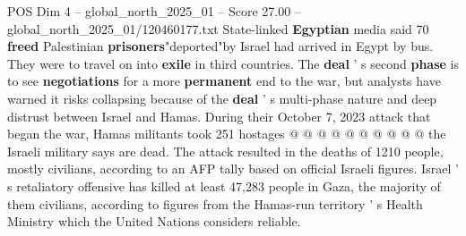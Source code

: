 \begin{textsample}{POS Dim 4 – global\_north\_2025\_01 – Score 27.00 – global\_north\_2025\_01/120460177.txt}
State-linked \textbf{Egyptian} media said 70 \textbf{freed} Palestinian \textbf{prisoners}"deported"by Israel had arrived in Egypt by bus.
They were to travel on into \textbf{exile} in third countries.
The \textbf{deal} ' s second \textbf{phase} is to see \textbf{negotiations} for a more \textbf{permanent} end to the war, but analysts have warned it risks collapsing because of the \textbf{deal} ' s multi-phase nature and deep distrust between Israel and Hamas.
During their October 7, 2023 attack that began the war, Hamas militants took 251 hostages @ @ @ @ @ @ @ @ @ @ the Israeli military says are dead.
The attack resulted in the deaths of 1210 people, mostly civilians, according to an AFP tally based on official Israeli figures.
Israel ' s retaliatory offensive has killed at least 47,283 people in Gaza, the majority of them civilians, according to figures from the Hamas-run territory ' s Health Ministry which the United Nations considers reliable.

\end{textsample}
